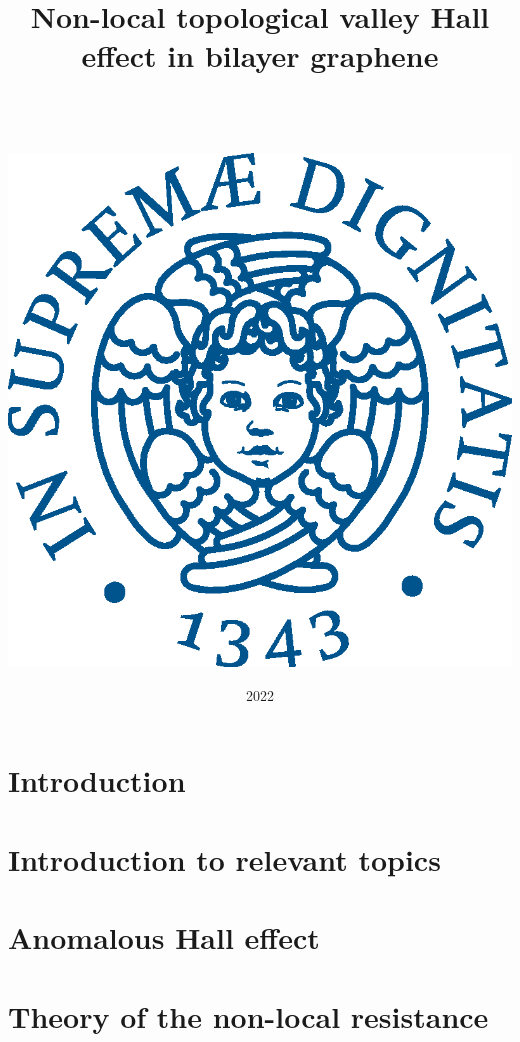 \documentclass[11pt,a4paper]{report}
\date{{\LARGE 2022}}
\title{{\myfont Non-local topological valley Hall effect in bilayer graphene}}
\author{{\Huge }\\ \\ \\
		\includegraphics[scale=0.6]{Immagini/cherubino.eps}\\}
\theoremstyle{definition}
\theoremstyle{plain}
\theoremstyle{plain}
\def\blankpage{%
      \clearpage%
      \null%
      \clearpage}
\begin{document}
	
    \thispagestyle{empty}%
    \addtocounter{page}{-1}%
    \null%
    \clearpage
	
	\blankpage
	\tableofcontents
	
	\chapter*{Introduction}
 	
    \blankpage

    
 	\chapter{Introduction to relevant topics}
 	
 	
 	
 	
 	
 	
    
    \blankpage
 	\chapter{Anomalous Hall effect}
    
	
	
	

    \chapter{Theory of the non-local resistance}
    
 	
  	

	
	
	\blankpage
	\printbibliography
\end{document}
